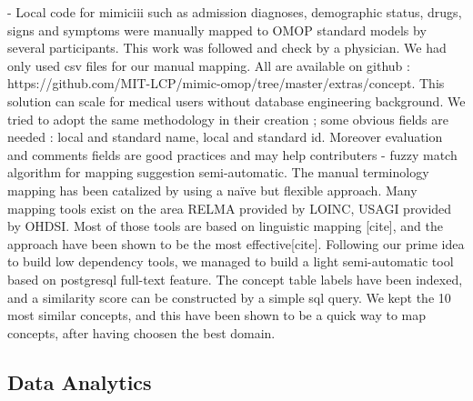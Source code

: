 - Local code for mimiciii such as admission diagnoses, demographic status, drugs, signs and symptoms were manually mapped to OMOP standard models by several participants. This work was followed and check by a physician. 
We had only used csv files for our manual mapping. All are available on github : https://github.com/MIT-LCP/mimic-omop/tree/master/extras/concept. This solution can scale for medical users without database engineering background. We tried to adopt the same methodology in their creation ; some obvious fields are needed : local and standard name, local and standard id. Moreover evaluation and comments fields are good practices and may help contributers
- fuzzy match algorithm for mapping suggestion semi-automatic.
The manual terminology mapping has been catalized by using a naïve but flexible
approach. Many mapping tools exist on the area RELMA provided by LOINC, USAGI
provided by OHDSI. Most of those tools are based on linguistic mapping [cite],
and the approach have been shown to be the most effective[cite]. Following our
prime idea to build low dependency tools, we managed to build a light
semi-automatic tool based on postgresql full-text feature. The concept table
labels have been indexed, and a similarity score can be constructed by a simple
sql query. We kept the 10 most similar concepts, and this have been shown to be
a quick way to map concepts, after having choosen the best domain.
\subsection{Data Analytics}
